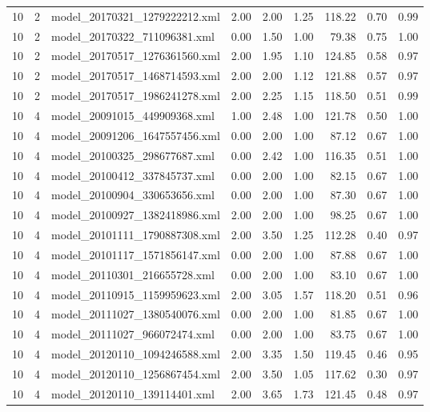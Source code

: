 \begin{table}[ht]
\begin{tabular}{rrlrrrrrr}
   10 &   2 & model\_20170321\_1279222212.xml & 2.00 & 2.00 & 1.25 & 118.22 & 0.70 & 0.99 \\ 
   10 &   2 & model\_20170322\_711096381.xml & 0.00 & 1.50 & 1.00 & 79.38 & 0.75 & 1.00 \\ 
   10 &   2 & model\_20170517\_1276361560.xml & 2.00 & 1.95 & 1.10 & 124.85 & 0.58 & 0.97 \\ 
   10 &   2 & model\_20170517\_1468714593.xml & 2.00 & 2.00 & 1.12 & 121.88 & 0.57 & 0.97 \\ 
   10 &   2 & model\_20170517\_1986241278.xml & 2.00 & 2.25 & 1.15 & 118.50 & 0.51 & 0.99 \\ 
   10 &   4 & model\_20091015\_449909368.xml & 1.00 & 2.48 & 1.00 & 121.78 & 0.50 & 1.00 \\ 
   10 &   4 & model\_20091206\_1647557456.xml & 0.00 & 2.00 & 1.00 & 87.12 & 0.67 & 1.00 \\ 
   10 &   4 & model\_20100325\_298677687.xml & 0.00 & 2.42 & 1.00 & 116.35 & 0.51 & 1.00 \\ 
   10 &   4 & model\_20100412\_337845737.xml & 0.00 & 2.00 & 1.00 & 82.15 & 0.67 & 1.00 \\ 
   10 &   4 & model\_20100904\_330653656.xml & 0.00 & 2.00 & 1.00 & 87.30 & 0.67 & 1.00 \\ 
   10 &   4 & model\_20100927\_1382418986.xml & 2.00 & 2.00 & 1.00 & 98.25 & 0.67 & 1.00 \\ 
   10 &   4 & model\_20101111\_1790887308.xml & 2.00 & 3.50 & 1.25 & 112.28 & 0.40 & 0.97 \\ 
   10 &   4 & model\_20101117\_1571856147.xml & 0.00 & 2.00 & 1.00 & 87.88 & 0.67 & 1.00 \\ 
   10 &   4 & model\_20110301\_216655728.xml & 0.00 & 2.00 & 1.00 & 83.10 & 0.67 & 1.00 \\ 
   10 &   4 & model\_20110915\_1159959623.xml & 2.00 & 3.05 & 1.57 & 118.20 & 0.51 & 0.96 \\ 
   10 &   4 & model\_20111027\_1380540076.xml & 0.00 & 2.00 & 1.00 & 81.85 & 0.67 & 1.00 \\ 
   10 &   4 & model\_20111027\_966072474.xml & 0.00 & 2.00 & 1.00 & 83.75 & 0.67 & 1.00 \\ 
   10 &   4 & model\_20120110\_1094246588.xml & 2.00 & 3.35 & 1.50 & 119.45 & 0.46 & 0.95 \\ 
   10 &   4 & model\_20120110\_1256867454.xml & 2.00 & 3.50 & 1.05 & 117.62 & 0.30 & 0.97 \\ 
   10 &   4 & model\_20120110\_139114401.xml & 2.00 & 3.65 & 1.73 & 121.45 & 0.48 & 0.97 \\ 

\end{tabular}
\end{table}
